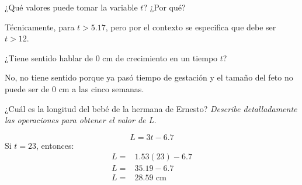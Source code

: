 \begin{multicols}{2}
\begin{parts}
\begin{solutionbox}{14em}
        \end{solutionbox}

        ¿Qué valores puede tomar la variable $t$? ¿Por qué?

        \begin{solutionbox}{5em}
            Técnicamente, para $t > 5.17$, pero por el contexto se especifica que debe ser
            $t > 12$.
        \end{solutionbox}

        \begin{subparts}
            \subpart ¿Tiene sentido hablar de 0 cm de crecimiento en un tiempo $t$?

            \begin{solutionbox}{6em}
                No, no tiene sentido porque ya pasó tiempo de gestación y el tamaño del
                feto no puede ser de 0 cm a las cinco semanas.
            \end{solutionbox}

        \end{subparts}

        ¿Cuál es la longitud del bebé de la hermana de Ernesto?
        \emph{Describe detalladamente las operaciones para obtener el valor de L.}

        \begin{solutionbox}{11em}
            \[L=3t-6.7\]
            Si $t=23$, entonces:
            \begin{align*}
                L=  & 1.53(23)-6.7     \\
                L=  & 35.19-6.7        \\
                L = & 28.59 \text{ cm}
            \end{align*}

        \end{solutionbox}
    \end{parts}
\end{multicols}